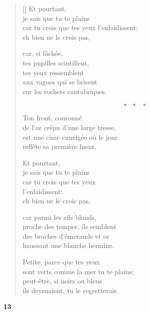 \documentclass[a4paper,12pt]{book}
\begin{document}
\begin{verse}[\versewidth]
  Et pourtant, \\
  je sais que tu te plains \\
  car tu crois que tes yeux
  l'enlaidissent: \\
  eh bien ne le crois pas,

  car, si fâchée, \\
  tes pupilles scintillent, \\
  tes yeux ressemblent \\
  aux vagues qui se brisent \\
  sur les rochers cantabriques.

  $$\star \ \ \ \star \ \ \ \star$$

  Ton front, couronné \\
  de l'or crépu d'une large tresse, \\
  est une cime enneigée où le jour \\
  reflète sa première lueur.

  Et pourtant, \\
  je sais que tu te plains \\
  car tu crois que tes yeux \\
  l'enlaidissent: \\
  eh bien ne le crois pas,

  car parmi les cils blonds, \\
  proche des tempes, ils semblent \\
  des broches d'émeraude et or \\
  haussant une blanche hermine.

  Petite, parce que tes yeux \\
  sont verts comme la mer tu te plains; \\
  peut-être, si noirs ou bleus \\
  ils devenaient, tu le regretterais.
\end{verse}

\bigskip

\begin{center}
  \textbf{13}
\end{center}

\settowidth{\versewidth}{comme un point de lumière irradie une idée,}
\end{document}
